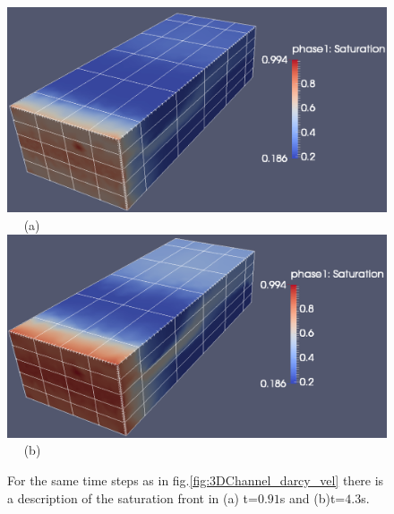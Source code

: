 \begin{landscape}
\begin{figure}[ht] 
\vbox{
\hbox{\hspace{3.5cm}
\includegraphics[width=1.0\textwidth]{./Pics1/3D_Channel/3D_channel_sat_100.pdf} 
}
\vspace{0.0cm}
\hbox{\hspace{10.0cm} (a)     
}
\hbox{\hspace{3.5cm}
\includegraphics[width=1.0\textwidth]{./Pics1/3D_Channel/3D_channel_sat_490.pdf}
}
\vspace{0.0cm}
\hbox{\hspace{10.cm} (b)      
}
}     
\caption{For the same time steps as in fig.\ref{fig:3DChannel_darcy_vel} there is a description of the saturation front in (a) t=$0.91$s and (b)t=$4.3$s.}
\label{fig:3DChannel_sat}
\end{figure}
\end{landscape}
\clearpage



